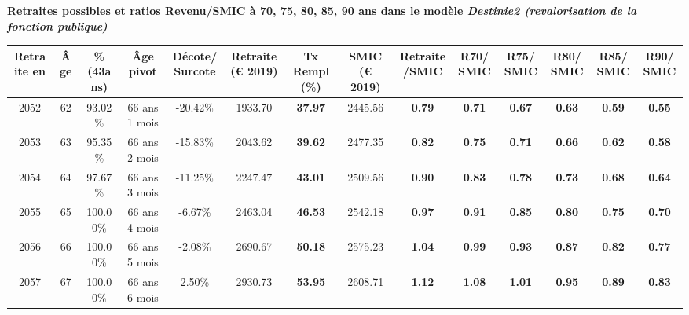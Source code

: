 \vspace{0.1cm} 
{\bf \noindent Retraites possibles et ratios Revenu/SMIC à 70, 75, 80, 85, 90 ans dans le modèle \emph{Destinie2 (revalorisation de la fonction publique)}}  
 
\begin{adjustbox}{max width=\textwidth} 
\begin{tabular}[htb]{|c|c||c|c|c||c|c||c|c||c|c|c|c|c|} 
\hline 
 Retraite en &  Âge &  \%(43ans) &  Âge pivot &  Décote/Surcote &  Retraite (\euro{} 2019) &  Tx Rempl(\%) &  SMIC (\euro{} 2019) &  Retraite/SMIC &  R70/SMIC &  R75/SMIC &  R80/SMIC &  R85/SMIC &  R90/SMIC \\ 
\hline \hline 
 2052 &  62 &  93.02\% &  66 ans 1 mois &  -20.42\% &  1933.70 &  {\bf 37.97} &  2445.56 &  {\bf {\color{red} 0.79}} &  {\bf {\color{red} 0.71}} &  {\bf {\color{red} 0.67}} &  {\bf {\color{red} 0.63}} &  {\bf {\color{red} 0.59}} &  {\bf {\color{red} 0.55}} \\ 
\hline 
 2053 &  63 &  95.35\% &  66 ans 2 mois &  -15.83\% &  2043.62 &  {\bf 39.62} &  2477.35 &  {\bf {\color{red} 0.82}} &  {\bf {\color{red} 0.75}} &  {\bf {\color{red} 0.71}} &  {\bf {\color{red} 0.66}} &  {\bf {\color{red} 0.62}} &  {\bf {\color{red} 0.58}} \\ 
\hline 
 2054 &  64 &  97.67\% &  66 ans 3 mois &  -11.25\% &  2247.47 &  {\bf 43.01} &  2509.56 &  {\bf {\color{red} 0.90}} &  {\bf {\color{red} 0.83}} &  {\bf {\color{red} 0.78}} &  {\bf {\color{red} 0.73}} &  {\bf {\color{red} 0.68}} &  {\bf {\color{red} 0.64}} \\ 
\hline 
 2055 &  65 &  100.00\% &  66 ans 4 mois &  -6.67\% &  2463.04 &  {\bf 46.53} &  2542.18 &  {\bf {\color{red} 0.97}} &  {\bf {\color{red} 0.91}} &  {\bf {\color{red} 0.85}} &  {\bf {\color{red} 0.80}} &  {\bf {\color{red} 0.75}} &  {\bf {\color{red} 0.70}} \\ 
\hline 
 2056 &  66 &  100.00\% &  66 ans 5 mois &  -2.08\% &  2690.67 &  {\bf 50.18} &  2575.23 &  {\bf 1.04} &  {\bf {\color{red} 0.99}} &  {\bf {\color{red} 0.93}} &  {\bf {\color{red} 0.87}} &  {\bf {\color{red} 0.82}} &  {\bf {\color{red} 0.77}} \\ 
\hline 
 2057 &  67 &  100.00\% &  66 ans 6 mois &  2.50\% &  2930.73 &  {\bf 53.95} &  2608.71 &  {\bf 1.12} &  {\bf 1.08} &  {\bf 1.01} &  {\bf {\color{red} 0.95}} &  {\bf {\color{red} 0.89}} &  {\bf {\color{red} 0.83}} \\ 
\hline 
\hline 
\end{tabular} 
\end{adjustbox} 
 
